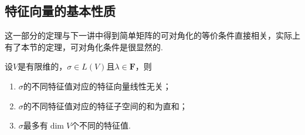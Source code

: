\subsection{特征向量的基本性质}

这一部分的定理与下一讲中得到简单矩阵的可对角化的等价条件直接相关，实际上有了本节的定理，可对角化条件是很显然的.
\begin{theorem}\label{thm:18:特征向量的基本性质}
    设$V$是有限维的，$\sigma\in L(V)$且$\lambda\in\mathbf{F}$，则
    \begin{enumerate}
        \item $\sigma$的不同特征值对应的特征向量线性无关；

        \item $\sigma$的不同特征值对应的特征子空间的和为直和；

        \item $\sigma$最多有$\dim V$个不同的特征值.
    \end{enumerate}
\end{theorem}

